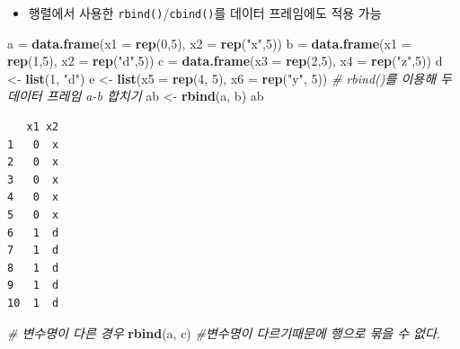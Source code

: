 \documentclass[
  11pt,
]{krantz}
\newenvironment{Shaded}{\begin{snugshade}}{\end{snugshade}}
\newcommand{\CommentTok}[1]{\textcolor[rgb]{0.37,0.37,0.37}{\textit{#1}}}
\newcommand{\DataTypeTok}[1]{\textcolor[rgb]{0.27,0.27,0.27}{#1}}
\newcommand{\DecValTok}[1]{\textcolor[rgb]{0.06,0.06,0.06}{#1}}
\newcommand{\KeywordTok}[1]{\textcolor[rgb]{0.27,0.27,0.27}{\textbf{#1}}}
\newcommand{\NormalTok}[1]{#1}
\newcommand{\StringTok}[1]{\textcolor[rgb]{0.5,0.5,0.5}{#1}}
\providecommand{\tightlist}{%
  \setlength{\itemsep}{0pt}\setlength{\parskip}{0pt}}
\begin{document}
\begin{itemize}
\tightlist
\item
  행렬에서 사용한 \texttt{rbind()}/\texttt{cbind()}를 데이터 프레임에도 적용 가능
\end{itemize}

\footnotesize

\begin{Shaded}
\begin{Highlighting}[]
\NormalTok{a =}\StringTok{ }\KeywordTok{data.frame}\NormalTok{(}\DataTypeTok{x1 =} \KeywordTok{rep}\NormalTok{(}\DecValTok{0}\NormalTok{,}\DecValTok{5}\NormalTok{), }\DataTypeTok{x2 =} \KeywordTok{rep}\NormalTok{(}\StringTok{"x"}\NormalTok{,}\DecValTok{5}\NormalTok{))}
\NormalTok{b =}\StringTok{ }\KeywordTok{data.frame}\NormalTok{(}\DataTypeTok{x1 =} \KeywordTok{rep}\NormalTok{(}\DecValTok{1}\NormalTok{,}\DecValTok{5}\NormalTok{), }\DataTypeTok{x2 =} \KeywordTok{rep}\NormalTok{(}\StringTok{"d"}\NormalTok{,}\DecValTok{5}\NormalTok{))}
\NormalTok{c =}\StringTok{ }\KeywordTok{data.frame}\NormalTok{(}\DataTypeTok{x3 =} \KeywordTok{rep}\NormalTok{(}\DecValTok{2}\NormalTok{,}\DecValTok{5}\NormalTok{), }\DataTypeTok{x4 =} \KeywordTok{rep}\NormalTok{(}\StringTok{"z"}\NormalTok{,}\DecValTok{5}\NormalTok{))}
\NormalTok{d <-}\StringTok{ }\KeywordTok{list}\NormalTok{(}\DecValTok{1}\NormalTok{, }\StringTok{"d"}\NormalTok{)}
\NormalTok{e <-}\StringTok{ }\KeywordTok{list}\NormalTok{(}\DataTypeTok{x5 =} \KeywordTok{rep}\NormalTok{(}\DecValTok{4}\NormalTok{, }\DecValTok{5}\NormalTok{), }\DataTypeTok{x6 =} \KeywordTok{rep}\NormalTok{(}\StringTok{"y"}\NormalTok{, }\DecValTok{5}\NormalTok{))}
\CommentTok{# rbind()를 이용해 두 데이터 프레임 a-b 합치기}
\NormalTok{ab <-}\StringTok{ }\KeywordTok{rbind}\NormalTok{(a, b)}
\NormalTok{ab}
\end{Highlighting}
\end{Shaded}

\begin{verbatim}
   x1 x2
1   0  x
2   0  x
3   0  x
4   0  x
5   0  x
6   1  d
7   1  d
8   1  d
9   1  d
10  1  d
\end{verbatim}

\begin{Shaded}
\begin{Highlighting}[]
\CommentTok{# 변수명이 다른 경우}
\KeywordTok{rbind}\NormalTok{(a, c) }\CommentTok{#변수명이 다르기때문에 행으로 묶을 수 없다.}
\end{Highlighting}
\end{Shaded}
\end{document}
